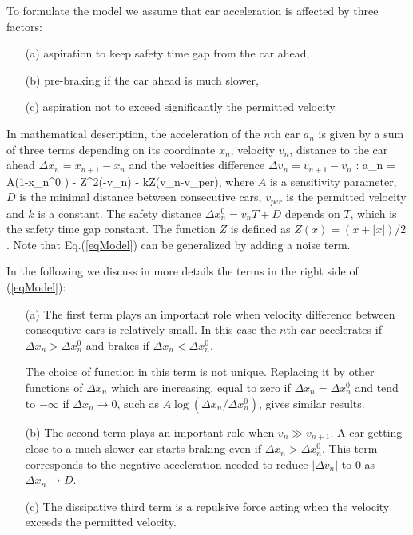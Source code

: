 To formulate the model we assume that car acceleration is affected by three
factors: \begin{itemize}
\item[(a)] aspiration to keep safety time gap from the car ahead,
\item[(b)] pre-braking if the car ahead is much slower,
\item[(c)] aspiration not to exceed significantly the permitted velocity.
\end{itemize}
In mathematical description, the acceleration of the $n$th car $a_n$ is 
given by a sum of three terms depending on its coordinate $x_n$, velocity
$v_n$, distance to the car ahead $\Delta x_n=x_{n+1}-x_n$ and the
velocities difference $\Delta v_n=v_{n+1}-v_n$ :
\be
\label{eqModel}
 a_n =  A(1-{{\Delta x_n^0}} ) - 
{ {Z^2(-\Delta v_n)}  } -
kZ(v_n-v_{per}),
\en
where $A$ is a sensitivity parameter, $D$ is the minimal 
distance between consecutive cars, $v_{per}$ is the permitted 
velocity and $k$ is a constant. The safety distance 
$\Delta x_n^0=v_nT+D$ depends on $T$, which is the safety time gap
constant. The function $Z$ is defined as $Z(x)=(x+|x|)/2$.
Note that Eq.(\ref{eqModel}) can be generalized by adding a noise term.

In the following we discuss in more details the terms in
the right side of (\ref{eqModel}): 

\begin{itemize}
\item[(a)] The first term plays an important role when
velocity difference between consequtive cars  is relatively small. 
In this case the $n$th car accelerates if $\Delta x_n > \Delta x_n^0$
and brakes if $\Delta x_n < \Delta x_n^0$.

The choice of function in this term is
not unique.  Replacing it by other functions of $\Delta x_n$ which
are increasing, equal to zero if $\Delta x_n=\Delta x_n^0$ and tend to
$-\infty$ if $\Delta x_n\to 0$, such as  $A\log({ \Delta x_n / \Delta
x_n^0})$, gives similar results.  

\item[(b)] The second term plays an important role when $v_n \gg v_{n+1}$. 
A car getting close to a much slower car starts braking
even if $\Delta x_n > \Delta x_n^0$. This term corresponds to the negative 
acceleration needed to reduce $|\Delta v_n|$ to $0$ as $\Delta x_n\to D$.

\item[(c)] The dissipative third term is a repulsive force
acting when the velocity exceeds the permitted velocity.
\end{itemize}

